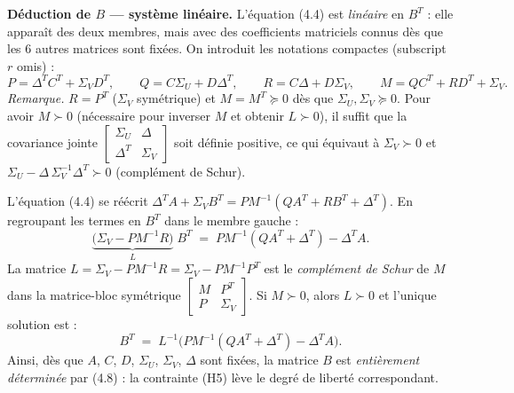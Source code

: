 \documentclass[12pt, a4paper]{article}
\begin{document}
{\medskip
\noindent\textbf{Déduction de $B$ — système linéaire.}
L'équation (4.4) est \emph{linéaire} en $B^T$ : elle apparaît des deux membres, mais avec des
coefficients matriciels connus dès que les 6 autres matrices sont fixées. On introduit les
notations compactes (subscript $r$ omis) :
\begin{equation}
  P = \Delta^T C^T + \Sigma_V D^T, \qquad
  Q = C\Sigma_U + D\Delta^T,       \qquad
  R = C\Delta + D\Sigma_V,         \qquad
  M = QC^T + RD^T + \Sigma_V.
  \tag{4.6}
\end{equation}
\textit{Remarque.} $R = P^T$ ($\Sigma_V$ symétrique) et $M = M^T \succeq 0$ dès que
$\Sigma_U, \Sigma_V \succeq 0$.  Pour avoir $M \succ 0$ (nécessaire pour inverser $M$ et
obtenir $L \succ 0$), il suffit que la covariance jointe
$\begin{bmatrix}\Sigma_U & \Delta \\ \Delta^T & \Sigma_V\end{bmatrix}$
soit définie positive, ce qui équivaut à $\Sigma_V \succ 0$ et
$\Sigma_U - \Delta\,\Sigma_V^{-1}\Delta^T \succ 0$ (complément de Schur).

\noindent L'équation (4.4) se réécrit $\Delta^T A + \Sigma_V B^T = PM^{-1}(QA^T + RB^T +
\Delta^T)$. En regroupant les termes en $B^T$ dans le membre gauche :
\begin{equation}
  \underbrace{\bigl(\Sigma_V - PM^{-1}R\bigr)}_{\displaystyle L}\; B^T
  \;=\; PM^{-1}(QA^T + \Delta^T) - \Delta^T A.
  \tag{4.7}
\end{equation}
La matrice $L = \Sigma_V - PM^{-1}R = \Sigma_V - PM^{-1}P^T$ est le
\emph{complément de Schur} de $M$ dans la matrice-bloc symétrique
$\begin{bmatrix} M & P^T \\ P & \Sigma_V \end{bmatrix}$.
Si $M \succ 0$, alors $L \succ 0$ et l'unique solution est :
\begin{equation}
  \boxed{B^T \;=\; L^{-1}\!\bigl(PM^{-1}(QA^T + \Delta^T) - \Delta^T A\bigr).}
  \tag{4.8}
\end{equation}
Ainsi, dès que $A$, $C$, $D$, $\Sigma_U$, $\Sigma_V$, $\Delta$ sont fixées, la matrice $B$ est
\emph{entièrement déterminée} par (4.8) : la contrainte (H5) lève le degré de liberté
correspondant.

}
\end{document}
